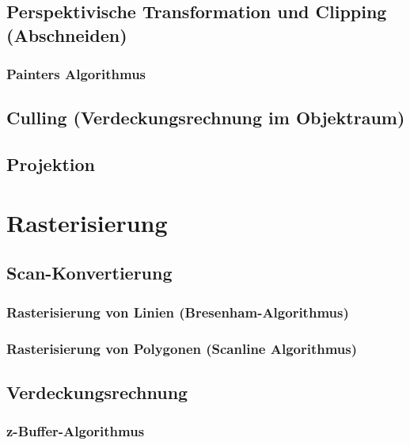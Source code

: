 \documentclass[a4paper, 11pt, accentcolor = tud3b]{tudreport}
\begin{document}
			\subsection{Perspektivische Transformation und Clipping (Abschneiden)} %

				\subsubsection{Painters Algorithmus} %

			\subsection{Culling (Verdeckungsrechnung im Objektraum)} %

			\subsection{Projektion} %

		\section{Rasterisierung} %

			\subsection{Scan-Konvertierung} %

				\subsubsection{Rasterisierung von Linien (Bresenham-Algorithmus)} %

				\subsubsection{Rasterisierung von Polygonen (Scanline Algorithmus)} %

			\subsection{Verdeckungsrechnung} %

				\subsubsection{z-Buffer-Algorithmus} %
\end{document}
